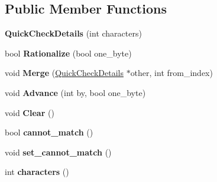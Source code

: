\subsection*{Public Member Functions}
\begin{DoxyCompactItemize}
\item 
{\bfseries Quick\+Check\+Details} (int characters)\hypertarget{classv8_1_1internal_1_1_quick_check_details_a540a949efa3f0606f9220d43a345af57}{}\label{classv8_1_1internal_1_1_quick_check_details_a540a949efa3f0606f9220d43a345af57}

\item 
bool {\bfseries Rationalize} (bool one\+\_\+byte)\hypertarget{classv8_1_1internal_1_1_quick_check_details_ae1375575f05c1b8495d884f11f89e1d3}{}\label{classv8_1_1internal_1_1_quick_check_details_ae1375575f05c1b8495d884f11f89e1d3}

\item 
void {\bfseries Merge} (\hyperlink{classv8_1_1internal_1_1_quick_check_details}{Quick\+Check\+Details} $\ast$other, int from\+\_\+index)\hypertarget{classv8_1_1internal_1_1_quick_check_details_a9275db5377df23388eddc8442aca75be}{}\label{classv8_1_1internal_1_1_quick_check_details_a9275db5377df23388eddc8442aca75be}

\item 
void {\bfseries Advance} (int by, bool one\+\_\+byte)\hypertarget{classv8_1_1internal_1_1_quick_check_details_afa8ebbf699903ccec8669022c18088d6}{}\label{classv8_1_1internal_1_1_quick_check_details_afa8ebbf699903ccec8669022c18088d6}

\item 
void {\bfseries Clear} ()\hypertarget{classv8_1_1internal_1_1_quick_check_details_ab10e327768c54ba36aa3cc084967380c}{}\label{classv8_1_1internal_1_1_quick_check_details_ab10e327768c54ba36aa3cc084967380c}

\item 
bool {\bfseries cannot\+\_\+match} ()\hypertarget{classv8_1_1internal_1_1_quick_check_details_a1ac4fec9167d102e73065ba875310e90}{}\label{classv8_1_1internal_1_1_quick_check_details_a1ac4fec9167d102e73065ba875310e90}

\item 
void {\bfseries set\+\_\+cannot\+\_\+match} ()\hypertarget{classv8_1_1internal_1_1_quick_check_details_ade659b1430587d338aa382e56b712cdf}{}\label{classv8_1_1internal_1_1_quick_check_details_ade659b1430587d338aa382e56b712cdf}

\item 
int {\bfseries characters} ()\hypertarget{classv8_1_1internal_1_1_quick_check_details_a1f86e113158421aefc278c15c1de0511}{}\label{classv8_1_1internal_1_1_quick_check_details_a1f86e113158421aefc278c15c1de0511}


\end{DoxyCompactItemize}
